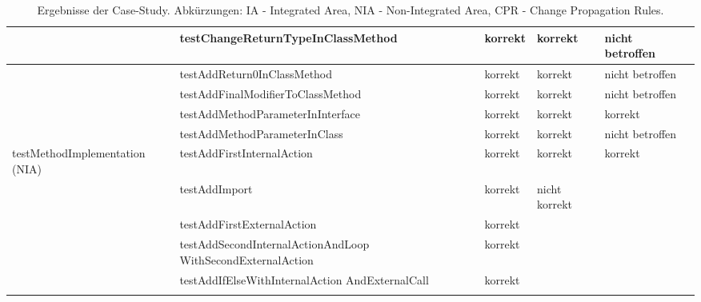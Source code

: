 \begin{tiny}
\begin{longtable}[c]{|p{2.2cm}|p{3.5cm}|p{1cm}|p{1cm}|p{1cm}|p{4cm}|}
 & testChangeReturnTypeInClassMethod & korrekt & korrekt & nicht 			betroffen &  \\ \hline
 & testAddReturn0InClassMethod & korrekt & korrekt & nicht 			betroffen &  \\ \hline
 & testAddFinalModifierToClassMethod & korrekt & korrekt & nicht 			betroffen &  \\ \hline
 & testAddMethodParameterInInterface & korrekt & korrekt & korrekt &  \\ \hline
 & testAddMethodParameterInClass & korrekt & korrekt & nicht 			betroffen &  \\ \hline
testMethodImplementation 			(NIA) & testAddFirstInternalAction & korrekt & korrekt & korrekt &  \\ \hline
 & testAddImport & korrekt & nicht 			korrekt &  &  \\ \hline
 & testAddFirstExternalAction & korrekt &  &  &  \\ \hline
 & testAddSecondInternalActionAndLoop WithSecondExternalAction & korrekt &  &  &  \\ \hline
 & testAddIfElseWithInternalAction AndExternalCall & korrekt &  &  &  \\ \hline
\caption{Ergebnisse der Case-Study. Abkürzungen: IA - Integrated Area, NIA - Non-Integrated Area, CPR - Change Propagation Rules.}
\label{tab:casestudy}\\
\end{longtable}

 
\end{tiny} 
 
